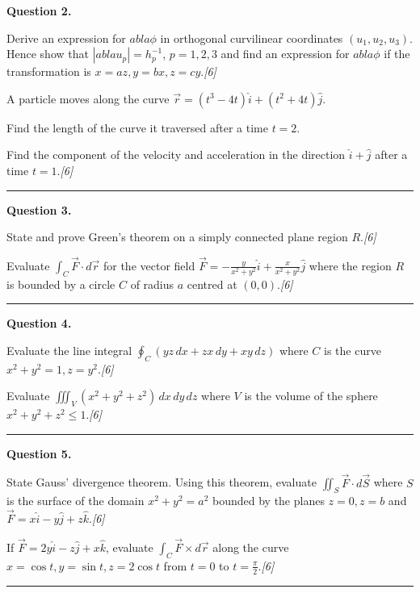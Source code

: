 \documentclass[11pt,a4paper]{article}
\newcommand{\pts}[1]{\hfill   \textit{[#1]}}
\begin{document}
\medskip


\noindent   \textbf{Question 2.}

\begin{parts}
  \item Derive an expression for $
abla \phi$ in orthogonal curvilinear coordinates $(u_1,u_2,u_3)$. Hence show that $|
abla u_p| = h_p^{-1}$, $p=1,2,3$ and find an expression for $
abla \phi$ if the transformation is $x=az, y=bx, z=cy$.\pts{6}
  \item A particle moves along the curve $\vec{r} = (t^3-4t)\hat{i} + (t^2+4t)\hat{j}$.
  
\begin{parts}
    \item Find the length of the curve it traversed after a time $t=2$.
    \item Find the component of the velocity and acceleration in the direction $\hat{i}+\hat{j}$ after a time $t=1$.\pts{6}
  \end{parts}
\end{parts}
\medskip\rule{\linewidth}{0.2pt}

\medskip


\noindent   \textbf{Question 3.}

\begin{parts}
  \item State and prove Green's theorem on a simply connected plane region $R$.\pts{6}
  \item Evaluate $\int_C \vec{F} \cdot d\vec{r}$ for the vector field $\vec{F} = -\frac{y}{x^2+y^2}\hat{i} + \frac{x}{x^2+y^2}\hat{j}$ where the region $R$ is bounded by a circle $C$ of radius $a$ centred at $(0,0)$.\pts{6}
\end{parts}
\medskip\rule{\linewidth}{0.2pt}

\medskip


\noindent   \textbf{Question 4.}

\begin{parts}
  \item Evaluate the line integral $\oint_C (yz\,dx + zx\,dy + xy\,dz)$ where $C$ is the curve $x^2+y^2=1, z=y^2$.\pts{6}
  \item Evaluate $\iiint_V (x^2+y^2+z^2)\,dx\,dy\,dz$ where $V$ is the volume of the sphere $x^2+y^2+z^2 \le 1$.\pts{6}
\end{parts}
\medskip\rule{\linewidth}{0.2pt}

\medskip


\noindent   \textbf{Question 5.}

\begin{parts}
  \item State Gauss' divergence theorem. Using this theorem, evaluate $\iint_S \vec{F} \cdot d\vec{S}$ where $S$ is the surface of the domain $x^2+y^2 = a^2$ bounded by the planes $z=0, z=b$ and $\vec{F} = x\hat{i} - y\hat{j} + z\hat{k}$.\pts{6}
  \item If $\vec{F} = 2y\hat{i} - z\hat{j} + x\hat{k}$, evaluate $\int_C \vec{F}  \times d\vec{r}$ along the curve $x=\cos t, y=\sin t, z=2\cos t$ from $t=0$ to $t=\frac{\pi}{2}$.\pts{6}
\end{parts}
\medskip\rule{\linewidth}{0.2pt}
\end{document}
